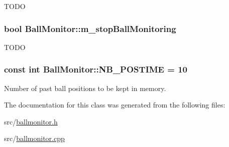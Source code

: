 \label{classBallMonitor_a306a59cfa638a9e4a4c8b6881b5e7f91}
TODO \hypertarget{classBallMonitor_a2486fa4296de6308930dc3864e05b61a}{
\subsubsection[{m\_\-stopBallMonitoring}]{\setlength{\rightskip}{0pt plus 5cm}bool {\bf BallMonitor::m\_\-stopBallMonitoring}}}
\label{classBallMonitor_a2486fa4296de6308930dc3864e05b61a}
TODO \hypertarget{classBallMonitor_a6603291a8d6c6a2de7b378ece54d5e2b}{
\subsubsection[{NB\_\-POSTIME}]{\setlength{\rightskip}{0pt plus 5cm}const int {\bf BallMonitor::NB\_\-POSTIME} = 10}}
\label{classBallMonitor_a6603291a8d6c6a2de7b378ece54d5e2b}
Number of past ball positions to be kept in memory. 

The documentation for this class was generated from the following files:\begin{DoxyCompactItemize}
\item 
src/\hyperlink{ballmonitor_8h}{ballmonitor.h}\item 
src/\hyperlink{ballmonitor_8cpp}{ballmonitor.cpp}\end{DoxyCompactItemize}
